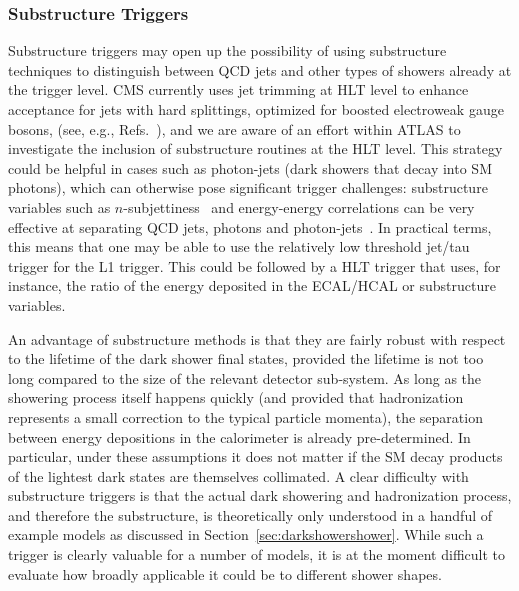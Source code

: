 \subsubsection{Substructure Triggers}
Substructure triggers may open up the possibility of using substructure techniques to distinguish between QCD jets and other types of showers already at the trigger level.
CMS currently uses jet trimming at HLT level to enhance acceptance for jets with hard splittings, optimized for boosted electroweak gauge bosons, (see, e.g., Refs.~\cite{Sirunyan:2017wto,Sirunyan:2017acf}), and we are aware of an effort within ATLAS to investigate the inclusion of substructure routines at the HLT level. This strategy could be helpful in cases such as photon-jets (dark showers that decay into SM photons), which can otherwise pose significant trigger challenges: substructure variables such as $n$-subjettiness~\cite{Thaler:2010tr} and energy-energy correlations can be very effective at separating QCD jets, photons and photon-jets~\cite{Ellis:2012sd,Ellis:2012zp}. In practical terms, this means that one may be able to use the relatively low threshold jet/tau trigger for the L1 trigger. This could be followed by a HLT trigger that uses, for instance, the ratio of the energy deposited in the ECAL/HCAL or substructure variables.

An advantage of  substructure methods is that they are fairly robust with respect to the lifetime of the dark shower final states, provided the lifetime is not too long compared to the size of the relevant detector sub-system. As long as the showering process itself happens quickly (and provided that hadronization represents a small correction to the typical particle momenta), %
the separation between energy depositions in the calorimeter is already pre-determined. In particular, under these assumptions it does not matter if the SM decay products of the lightest dark states are themselves collimated. %
A clear difficulty with substructure triggers is that the actual dark showering and hadronization process, and therefore the substructure, is theoretically only understood in a handful of example models as discussed in Section~\ref{sec:darkshowershower}. While such a trigger is clearly valuable for a number of models, it is at the moment difficult to evaluate how broadly applicable it could be to different shower shapes.

